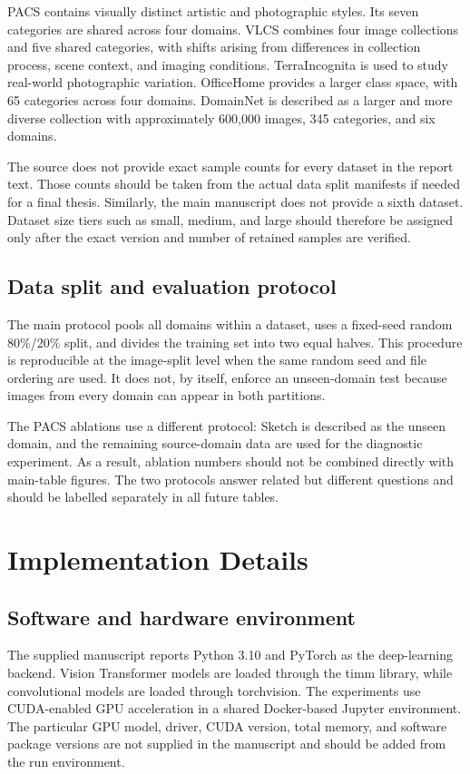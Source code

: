 \documentclass[11pt,a4paper]{article}
\begin{document}
PACS contains visually distinct artistic and photographic styles. Its seven categories are shared across four domains. VLCS combines four image collections and five shared categories, with shifts arising from differences in collection process, scene context, and imaging conditions. TerraIncognita is used to study real-world photographic variation. OfficeHome provides a larger class space, with 65 categories across four domains. DomainNet is described as a larger and more diverse collection with approximately 600,000 images, 345 categories, and six domains.

The source does not provide exact sample counts for every dataset in the report text. Those counts should be taken from the actual data split manifests if needed for a final thesis. Similarly, the main manuscript does not provide a sixth dataset. Dataset size tiers such as small, medium, and large should therefore be assigned only after the exact version and number of retained samples are verified.

\subsection{Data split and evaluation protocol}
The main protocol pools all domains within a dataset, uses a fixed-seed random 80\%/20\% split, and divides the training set into two equal halves. This procedure is reproducible at the image-split level when the same random seed and file ordering are used. It does not, by itself, enforce an unseen-domain test because images from every domain can appear in both partitions.

The PACS ablations use a different protocol: Sketch is described as the unseen domain, and the remaining source-domain data are used for the diagnostic experiment. As a result, ablation numbers should not be combined directly with main-table figures. The two protocols answer related but different questions and should be labelled separately in all future tables.

\section{Implementation Details}

\subsection{Software and hardware environment}
The supplied manuscript reports Python 3.10 and PyTorch as the deep-learning backend. Vision Transformer models are loaded through the timm library, while convolutional models are loaded through torchvision. The experiments use CUDA-enabled GPU acceleration in a shared Docker-based Jupyter environment. The particular GPU model, driver, CUDA version, total memory, and software package versions are not supplied in the manuscript and should be added from the run environment.
\end{document}
